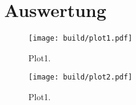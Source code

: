 \section{Auswertung}
\label{sec:Auswertung}
\begin{figure}
  \centering
  \texttt{[image: build/plot1.pdf]}
  \caption{Plot1.}
  \label{fig:plot1}
\end{figure}
\begin{figure}
  \centering
  \texttt{[image: build/plot2.pdf]}
  \caption{Plot1.}
  \label{fig:plot1}
\end{figure}
